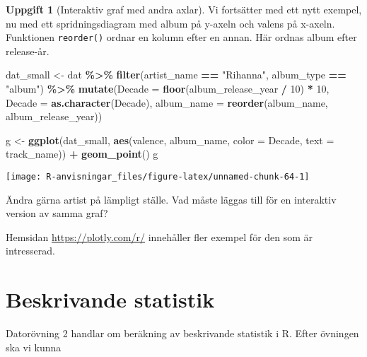\documentclass[
]{book}
\newenvironment{Shaded}{\begin{snugshade}}{\end{snugshade}}
\newcommand{\AttributeTok}[1]{\textcolor[rgb]{0.13,0.29,0.53}{#1}}
\newcommand{\DecValTok}[1]{\textcolor[rgb]{0.00,0.00,0.81}{#1}}
\newcommand{\FunctionTok}[1]{\textcolor[rgb]{0.13,0.29,0.53}{\textbf{#1}}}
\newcommand{\NormalTok}[1]{#1}
\newcommand{\OtherTok}[1]{\textcolor[rgb]{0.56,0.35,0.01}{#1}}
\newcommand{\SpecialCharTok}[1]{\textcolor[rgb]{0.81,0.36,0.00}{\textbf{#1}}}
\newcommand{\StringTok}[1]{\textcolor[rgb]{0.31,0.60,0.02}{#1}}
\theoremstyle{definition}
\theoremstyle{definition}
\theoremstyle{definition}
\newtheorem{exercise}{Uppgift}[chapter]
\theoremstyle{definition}
\theoremstyle{remark}
\begin{document}
\begin{exercise}[Interaktiv graf med andra axlar]
Vi fortsätter med ett nytt exempel, nu med ett spridningsdiagram med album på y-axeln och valens på x-axeln. Funktionen \texttt{reorder()} ordnar en kolumn efter en annan. Här ordnas album efter release-år.

\begin{Shaded}
\begin{Highlighting}[]
\NormalTok{dat\_small }\OtherTok{\textless{}{-}}\NormalTok{ dat }\SpecialCharTok{\%\textgreater{}\%} 
  \FunctionTok{filter}\NormalTok{(artist\_name }\SpecialCharTok{==} \StringTok{"Rihanna"}\NormalTok{, album\_type }\SpecialCharTok{==} \StringTok{"album"}\NormalTok{) }\SpecialCharTok{\%\textgreater{}\%} 
  \FunctionTok{mutate}\NormalTok{(}\AttributeTok{Decade =} \FunctionTok{floor}\NormalTok{(album\_release\_year }\SpecialCharTok{/} \DecValTok{10}\NormalTok{) }\SpecialCharTok{*} \DecValTok{10}\NormalTok{,}
         \AttributeTok{Decade =} \FunctionTok{as.character}\NormalTok{(Decade),}
         \AttributeTok{album\_name =} \FunctionTok{reorder}\NormalTok{(album\_name, album\_release\_year))}

\NormalTok{g }\OtherTok{\textless{}{-}} \FunctionTok{ggplot}\NormalTok{(dat\_small, }\FunctionTok{aes}\NormalTok{(valence, album\_name, }\AttributeTok{color =}\NormalTok{ Decade, }\AttributeTok{text =}\NormalTok{ track\_name)) }\SpecialCharTok{+}
  \FunctionTok{geom\_point}\NormalTok{()}
\NormalTok{g}
\end{Highlighting}
\end{Shaded}

\begin{center}\texttt{[image: R-anvisningar\_files/figure-latex/unnamed-chunk-64-1]} \end{center}

Ändra gärna artist på lämpligt ställe.
Vad måste läggas till för en interaktiv version av samma graf?
\end{exercise}

Hemsidan \url{https://plotly.com/r/} innehåller fler exempel för den som är intresserad.

\hypertarget{beskrivande-statistik}{%
\chapter{Beskrivande statistik}\label{beskrivande-statistik}}

Datorövning 2 handlar om beräkning av beskrivande statistik i R. Efter övningen ska vi kunna
\end{document}
